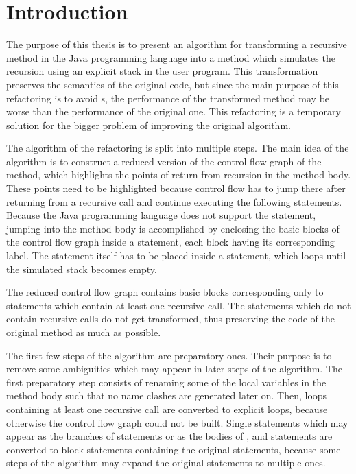 \chapter{Introduction}

The purpose of this thesis is to present an algorithm for transforming a recursive method in the Java programming
language into a method which simulates the recursion using an explicit stack in the user program. This transformation
preserves the semantics of the original code, but since the main purpose of this refactoring\cite{refactoring}
is to avoid s, the performance of the transformed method may be worse than the performance of
the original one. This refactoring is a temporary solution for the bigger problem of improving the original algorithm.

The algorithm of the refactoring is split into multiple steps. The main idea of the algorithm is to construct a reduced
version of the control flow graph of the method, which highlights the points of return from recursion in the method
body. These points need to be highlighted because control flow has to jump there after returning from a recursive call
and continue executing the following statements. Because the Java programming language does not support the 
statement, jumping into the method body is accomplished by enclosing the basic blocks of the control flow graph inside
a  statement, each block having its corresponding  label. The  statement itself
has to be placed inside a  statement, which loops until the simulated stack becomes empty.

The reduced control flow graph contains basic blocks corresponding only to statements which contain at least one
recursive call. The statements which do not contain recursive calls do not get transformed, thus preserving the code of
the original method as much as possible.

The first few steps of the algorithm are preparatory ones. Their purpose is to remove some ambiguities which may appear
in later steps of the algorithm. The first preparatory step consists of renaming some of the local variables in the
method body such that no name clashes are generated later on. Then,  loops containing at least one
recursive call are converted to explicit  loops, because otherwise the control flow graph could not be built.
Single statements which may appear as the branches of  statements or as the bodies of , 
and  statements are converted to block statements containing the original statements, because some steps
of the algorithm may expand the original statements to multiple ones.

